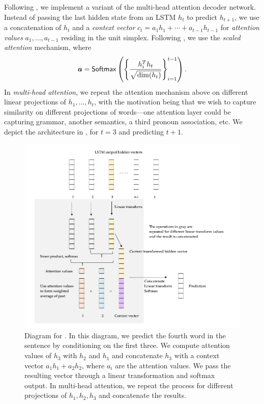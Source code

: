 \documentclass[12pt]{article}
\begin{document}
Following \cite{vaswani2017attention}, we implement a variant of the multi-head
attention
decoder network. Instead of passing the last hidden state from an LSTM $h_t$ to
predict $h_{t+1}$, we use a concatenation of $h_t$ and a \emph{context vector}
$c_t = a_1 h_1 + \cdots + a_{t-1} h_{t-1}$ for \emph{attention values}
$a_1,\ldots, a_{t-1}$ residing in the unit simplex. Following 
\cite{vaswani2017attention}, we use the \emph{scaled attention} mechanism,
where \[
\bm a = \mathsf{Softmax}\left({\left\{{\frac{h_i^T h_t}{\sqrt{\dim(h_t)}}}\right\}_{i=1}^{t-1}}\right).
\]
In \emph{multi-head attention}, we repeat the attention mechanism above on
different linear projections of $h_1,\ldots,h_t$, with the motivation being that
we wish to capture similarity on different projections of words---one attention
layer could be capturing grammar, another semantics, a third pronoun
association, etc. We depict the architecture in , for $t=3$ and
predicting $t+1$.
\begin{figure}[tb]
    \centering
    \includegraphics[width=\textwidth]{figs/attention.png}
    \caption{Diagram for . In this diagram, we predict the
    fourth word in the sentence by conditioning on the first three. We compute
    attention values of $h_3$ with $h_2$ and $h_1$ and concatenate $h_3$ with a
    context vector $a_1 h_1 + a_2 h_2$, where $a_i$ are the attention values.
    We pass the resulting vector through a linear transformation and softmax
    output. In multi-head attention, we repeat the process for different
    projections of $h_1,h_2,h_3$ and concatenate the results.}
    \label{fig:attn}
\end{figure}
\end{document}
